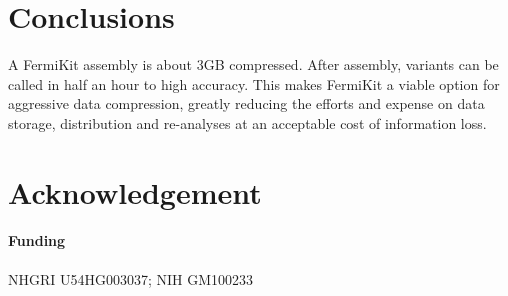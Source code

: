\documentclass{bioinfo}
\begin{document}
\section{Conclusions}

A FermiKit assembly is about 3GB compressed. After assembly, variants can be
called in half an hour to high accuracy. This makes FermiKit a viable option for
aggressive data compression, greatly reducing the efforts and expense on data
storage, distribution and re-analyses at an acceptable cost of information loss.

\section*{Acknowledgement}
\paragraph{Funding\textcolon} NHGRI U54HG003037; NIH GM100233


\end{document}
